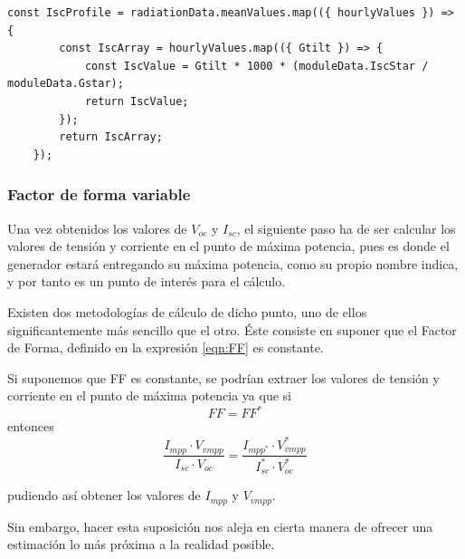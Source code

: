 \begin{lstlisting}[style=ES6, caption={Cálculo de la corriente de cortocircuito}]
	const IscProfile = radiationData.meanValues.map(({ hourlyValues }) => {
		const IscArray = hourlyValues.map(({ Gtilt }) => {
			const IscValue = Gtilt * 1000 * (moduleData.IscStar / moduleData.Gstar);
			return IscValue;
		});
		return IscArray;
	});
\end{lstlisting}

\subsubsection{Factor de forma variable}
\label{section:var_form_factor}

Una vez obtenidos los valores de $V_{oc}$ y $I_{sc}$, el siguiente paso ha de ser calcular los valores de tensión y corriente en el punto de máxima potencia, pues es donde el generador estará entregando su máxima potencia, como su propio nombre indica, y por tanto es un punto de interés para el cálculo.

Existen dos metodologías de cálculo de dicho punto, uno de ellos significantemente más sencillo que el otro. Éste consiste en suponer que el Factor de Forma, definido en la expresión \ref{eqn:FF} es constante.

Si suponemos que FF es constante, se podrían extraer los valores de tensión y corriente en el punto de máxima potencia ya que si
\begin{equation}
FF = FF^*
\end{equation}
entonces
\begin{equation}
\frac{I_{mpp} \cdot V_{vmpp}}{I_{sc} \cdot V_{oc}} = \frac{I_{mpp^*} \cdot V_{vmpp}^*}{I_{sc}^* \cdot V_{oc}^*}
\end{equation}

pudiendo así obtener los valores de $I_{mpp}$ y $V_{vmpp}$.

Sin embargo, hacer esta suposición nos aleja en cierta manera de ofrecer una estimación lo más próxima a la realidad posible.

